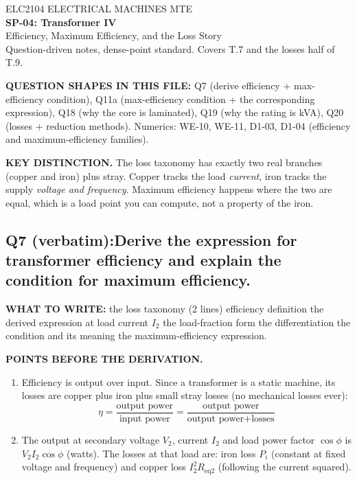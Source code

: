 \documentclass[11pt]{article}
\newcommand{\qhead}[2]{\subsection*{\color{copper}#1\quad\color{iron}#2}}
\newcommand{\tagline}[1]{\textbf{\color{copper}#1}}
\newcommand{\keydist}[1]{\vspace{2pt}\textbf{\color{red}KEY DISTINCTION.} #1}
\begin{document}
\begin{center}
{\footnotesize\color{copper} ELC2104 \textbar{} ELECTRICAL MACHINES \textbar{} MTE}\\[6pt]
{\LARGE\bfseries\color{iron} SP-04: Transformer IV}\\[2pt]
{\Large\color{copper} Efficiency, Maximum Efficiency, and the Loss Story}\\[6pt]
{\footnotesize\color{muted} Question-driven notes, dense-point standard. Covers T.7 and the losses half of T.9.}
\end{center}

\vspace{2pt}
\tagline{QUESTION SHAPES IN THIS FILE:} Q7 (derive efficiency + max-efficiency condition), Q11a (max-efficiency condition + the corresponding expression), Q18 (why the core is laminated), Q19 (why the rating is kVA), Q20 (losses + reduction methods). Numerics: WE-10, WE-11, D1-03, D1-04 (efficiency and maximum-efficiency families).
\vspace{2pt}

\keydist{The loss taxonomy has exactly two real branches (copper and iron) plus stray. Copper tracks the load \emph{current}, iron tracks the supply \emph{voltage and frequency}. Maximum efficiency happens where the two are equal, which is a load point you can compute, not a property of the iron.}

\hrulefill

\qhead{Q7 (verbatim):}{Derive the expression for transformer efficiency and explain the condition for maximum efficiency.}

\tagline{WHAT TO WRITE:} the loss taxonomy (2 lines) \textrightarrow{} efficiency definition \textrightarrow{} the derived expression at load current $I_2$ \textrightarrow{} the load-fraction form \textrightarrow{} the differentiation \textrightarrow{} the condition and its meaning \textrightarrow{} the maximum-efficiency expression.

\tagline{POINTS BEFORE THE DERIVATION.}
\begin{enumerate}[label=\arabic*.]
\item Efficiency is output over input. Since a transformer is a static machine, its losses are copper plus iron plus small stray losses (no mechanical losses ever):
\[
\eta = \frac{\text{output power}}{\text{input power}} = \frac{\text{output power}}{\text{output power} + \text{losses}}
\]
\item The output at secondary voltage $V_2$, current $I_2$ and load power factor $\cos\phi$ is $V_2 I_2\cos\phi$ (watts). The losses at that load are: iron loss $P_i$ (constant at fixed voltage and frequency) and copper loss $I_2^{2} R_{\text{eq2}}$ (following the current squared).
\end{enumerate}
\end{document}
